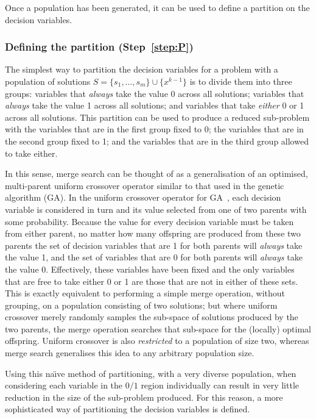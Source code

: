 \documentclass[journal]{IEEEtran}
\begin{document}
Once a population has been generated, it can be used to define a partition on the decision variables.

\subsubsection*{\textbf{Defining the partition (Step~\ref{step:P})}}

The simplest way to partition the decision variables for a problem with a population of solutions $S = \{s_1,\dots,s_m\}\cup \{x^{k-1}\}$ is to divide them into three groups: variables that \emph{always} take the value 0 across all solutions; variables that \emph{always} take the value 1 across all solutions; and variables that take \emph{either} 0 or 1 across all solutions. This partition can be used to produce a reduced sub-problem with the variables that are in the first group fixed to 0; the variables that are in the second group fixed to 1; and the variables that are in the third group allowed to take either.

In this sense, merge search can be thought of as a generalisation of an optimised, multi-parent uniform crossover operator similar to that used in the genetic algorithm (GA). In the uniform crossover operator for GA~\cite{meta-essentials}, each decision variable is considered in turn and its value selected from one of two parents with some probability. Because the value for every decision variable must be taken from either parent, no matter how many offspring are produced from these two parents the set of decision variables that are 1 for both parents will \emph{always} take the value 1, and the set of variables that are 0 for both parents will \emph{always} take the value 0. Effectively, these variables have been fixed and the only variables that are free to take either 0 or 1 are those that are not in either of these sets. This is exactly equivalent to performing a simple merge operation, without grouping, on a population consisting of two solutions; but where uniform crossover merely randomly samples the sub-space of solutions produced by the two parents, the merge operation searches that sub-space for the (locally) optimal offspring. Uniform crossover is also \emph{restricted} to a population of size two, whereas merge search generalises this idea to any arbitrary population size.

Using this na{\"\i}ve method of partitioning, with a very diverse population, when considering each variable in the $0/1$ region individually can result in very little reduction in the size of the sub-problem produced. For this reason, a more sophisticated way of partitioning the decision variables is defined.
\end{document}
